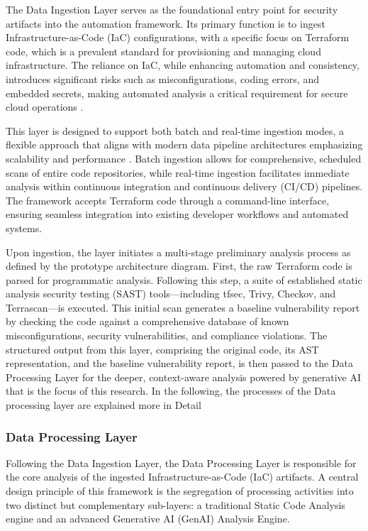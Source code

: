 The Data Ingestion Layer serves as the foundational entry point for security artifacts into the automation framework. Its primary function is to ingest Infrastructure-as-Code (IaC) configurations, with a specific focus on Terraform code, which is a prevalent standard for provisioning and managing cloud infrastructure. The reliance on IaC, while enhancing automation and consistency, introduces significant risks such as misconfigurations, coding errors, and embedded secrets, making automated analysis a critical requirement for secure cloud operations \cite{hayagreevan_security_2024}.

This layer is designed to support both batch and real-time ingestion modes, a flexible approach that aligns with modern data pipeline architectures emphasizing scalability and performance \cite{ismail_big_2025}. Batch ingestion allows for comprehensive, scheduled scans of entire code repositories, while real-time ingestion facilitates immediate analysis within continuous integration and continuous delivery (CI/CD) pipelines. The framework accepts Terraform code through a command-line interface, ensuring seamless integration into existing developer workflows and automated systems.

Upon ingestion, the layer initiates a multi-stage preliminary analysis process as defined by the prototype architecture diagram. First, the raw Terraform code is parsed for programmatic analysis. Following this step, a suite of established static analysis security testing (SAST) tools—including tfsec, Trivy, Checkov, and Terrascan—is executed. This initial scan generates a baseline vulnerability report by checking the code against a comprehensive database of known misconfigurations, security vulnerabilities, and compliance violations. The structured output from this layer, comprising the original code, its AST representation, and the baseline vulnerability report, is then passed to the Data Processing Layer for the deeper, context-aware analysis powered by generative AI that is the focus of this research. In the following, the processes of the Data processing layer are explained more in Detail


\subsubsection{Data Processing Layer} %
\label{sec:Data Processing Layer}

Following the Data Ingestion Layer, the Data Processing Layer is responsible for the core analysis of the ingested Infrastructure-as-Code (IaC) artifacts. A central design principle of this framework is the segregation of processing activities into two distinct but complementary sub-layers: a traditional Static Code Analysis engine and an advanced Generative AI (GenAI) Analysis Engine.

